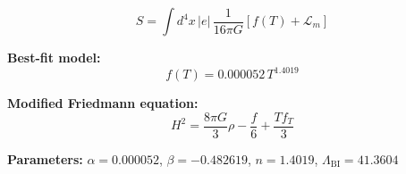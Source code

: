 
\begin{equation}
  S = \int d^4x \, |e| \, \frac{1}{16\pi G} \left[ f(T) + \mathcal{L}_m \right]
\end{equation}

\textbf{Best-fit model:}
\begin{equation}
  f(T) = 0.000052 \, T^{1.4019}
\end{equation}

\textbf{Modified Friedmann equation:}
\begin{equation}
  H^2 = \frac{8\pi G}{3} \rho - \frac{f}{6} + \frac{T f_T}{3}
\end{equation}

\textbf{Parameters:}
$\alpha = 0.000052$, \quad
$\beta = -0.482619$, \quad
$n = 1.4019$, \quad
$\Lambda_{\text{BI}} = 41.3604$
